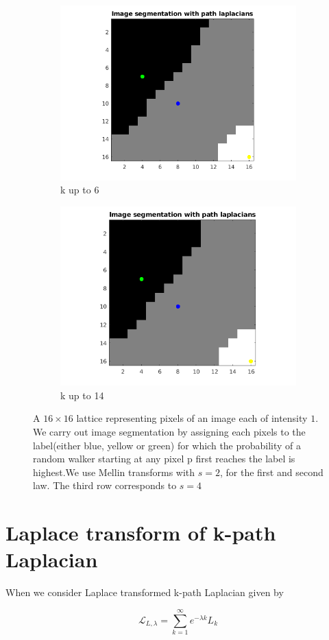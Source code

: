 \documentclass[10pt,a4paper]{article}
\begin{document}
\begin{figure}[H]
\begin{subfigure}[b]{0.45\textwidth}
		\includegraphics[width=\textwidth]{segmentation-images/16by16longrange6-s4.png}
		\caption{k up to 6}
	\end{subfigure}
	\begin{subfigure}[b]{0.45\textwidth}
		\includegraphics[width=\textwidth]{segmentation-images/16by16longrange14-s4.png}
		\caption{k up to 14}
	\end{subfigure}  
	
	\caption{ A $16 \times 16$ lattice representing pixels of an image each of intensity $1$. We carry out image segmentation by assigning each pixels to the label(either blue, yellow or green) for which the probability of a random walker starting at any pixel p first reaches the label is highest.We use Mellin transforms with $s=2$, for the first and second law. The third row corresponds to $s=4$ } 
\end{figure}




\section{Laplace transform of k-path Laplacian}

When we consider Laplace transformed k-path Laplacian given by 

\begin{equation*}
\mathcal{L}_{L,\lambda} = \sum_{k=1}^{\infty} e^{-\lambda k} L_k
\end{equation*}
\end{document}
